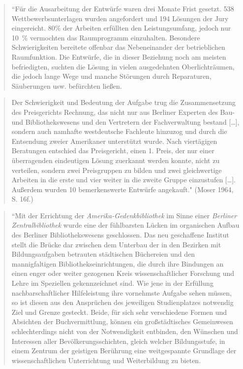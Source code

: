 \documentclass[a4paper,
fontsize=11pt,
oneside,
numbers=noperiodatend,
parskip=half-,
bibliography=totoc,
final
]{scrartcl}
\begin{document}
\begin{quote}
``Für die Ausarbeitung der Entwürfe waren drei Monate Frist gesetzt. 538
Wettbewerbsunterlagen wurden angefordert und 194 Lösungen der Jury
eingereicht. 80\% der Arbeiten erfüllten den Leistungsumfang, jedoch nur
10~\% vermochten das Raumprogramm einzuhalten. Besondere Schwierigkeiten
bereitete offenbar das Nebeneinander der betrieblichen Raumfunktion. Die
Entwürfe, die in dieser Beziehung noch am meisten befriedigten, suchten
die Lösung in vielen ausgedehnten Oberlichträumen, die jedoch lange Wege
und manche Störungen durch Reparaturen, Säu\-berungen usw. befürchten
ließen.
\end{quote}

\begin{quote}
Der Schwierigkeit und Bedeutung der Aufgabe trug die Zusammensetzung des
Preisgerichts Rechnung, das nicht nur aus Berliner Experten des Bau- und
Bibliothekswesens und den Vertretern der Fachverwaltung bestand
{[}\ldots{}{]}, sondern auch namhafte westdeutsche Fachleute hinzuzog
und durch die Entsendung zweier Amerikaner unterstützt wurde. Nach
viertägigen Beratungen entschied das Preisgericht, einen 1. Preis, der
nur einer überragenden eindeutigen Lösung zuerkannt werden konnte, nicht
zu verteilen, sondern zwei Preisgruppen zu bilden und zwei gleichwertige
Arbeiten in die erste und vier weiter in die zweite Gruppe einzustufen
{[}\ldots{}{]}. Außerdem wurden 10 bemerkenswerte Entwürfe angekauft."
(Moser 1964, S. 16f.)
\end{quote}

\begin{quote}
``Mit der Errichtung der \emph{Amerika-Gedenkbibliothek} im Sinne
einer \emph{Berliner Zentralbibliothek} wurde eine der fühlbarsten Lücken
im organischen Aufbau des Berliner Bibliothekswesens geschlossen. Das
neu geschaffene Institut stellt die Brücke dar zwischen dem Unterbau der
in den Bezirken mit Bildungsaufgaben betrauten städtischen Bü\-cher\-eien
und den mannigfaltigen Bibliothekseinrichtungen, die durch ihre
Bindungen an einen enger oder weiter gezogenen Kreis wissenschaftlicher
Forschung und Lehre im Speziellen gekennzeichnet sind. Wie jene in der
Erfüllung nachbarschaftlicher Hilfeleistung ihre vornehmste Aufgabe
sehen müssen, so ist diesen aus den Ansprüchen des jeweiligen
Studienplatzes notwendig Ziel und Grenze gesteckt. Beide, für sich sehr
verschiedene Formen und Absichten der Buchvermittlung, können ein
großstädtisches Gemeinwesen schlechterdings nicht von der Notwendigkeit
entbinden, den Wünschen und Interessen aller Bevölkerungsschichten,
gleich welcher Bildungsstufe, in einem Zentrum der geistigen Berührung
eine weitgespannte Grundlage der wissenschaftlichen Unterrichtung und
Weiterbildung zu bieten.
\end{quote}
\end{document}
